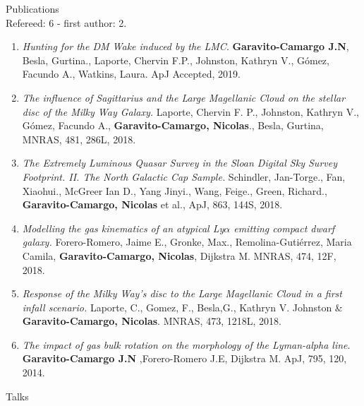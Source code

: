 \documentclass[UTF8]{article}
\begin{document}
{\Large Publications}\\

\indent \indent Refereed: 6 - first author: 2.

\begin{enumerate}

\item \textit{Hunting for the DM Wake induced by the LMC}.  \textbf{Garavito-Camargo J.N}, Besla, Gurtina., Laporte, Chervin F.P.,
    Johnston, Kathryn V., G\'omez, Facundo A., Watkins, Laura. ApJ Accepted, 2019.
\item \textit{The influence of Sagittarius and the Large Magellanic Cloud on the
  stellar disc of the Milky Way Galaxy.} Laporte, Chervin F. P., Johnston,
  Kathryn V., G\'omez, Facundo A., \textbf{Garavito-Camargo, Nicolas}., Besla, Gurtina, MNRAS, 481, 286L, 2018.
\item \textit{The Extremely Luminous Quasar Survey in the Sloan Digital Sky Survey Footprint. II. The North Galactic Cap Sample.} Schindler, Jan-Torge., Fan, Xiaohui., McGreer Ian D., Yang Jinyi., Wang, Feige., Green, Richard., \textbf{Garavito-Camargo, Nicolas} et al., ApJ, 863, 144S, 2018.
\item \textit{Modelling the gas kinematics of an atypical Ly$\alpha$
emitting compact dwarf galaxy.} Forero-Romero, Jaime E., Gronke, Max., Remolina-Gutiérrez, Maria Camila, \textbf{Garavito-Camargo, Nicolas}, Dijkstra M. MNRAS, 474, 12F, 2018.
\item \textit{Response of the Milky Way's disc to the Large Magellanic Cloud in a first infall scenario.} Laporte, C., Gomez, F., Besla,G., Kathryn V. Johnston \& \textbf{Garavito-Camargo, Nicolas}. MNRAS, 473, 1218L, 2018.
 \item \textit{The impact of gas bulk rotation on the morphology of the
   Lyman-alpha line}. \textbf{Garavito-Camargo J.N} ,Forero-Romero J.E, Dijkstra
   M. ApJ, 795, 120, 2014.
\end{enumerate}

{\Large Talks}\\
\end{document}

